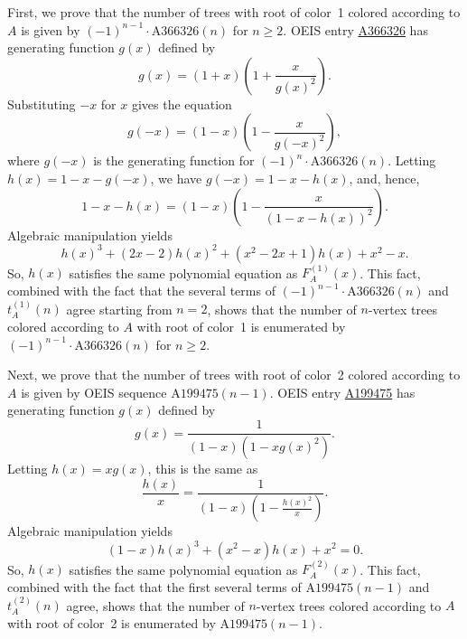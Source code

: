 \documentclass[12pt]{amsart}
\newcommand{\seqnum}[1]{\href{https://oeis.org/#1}{#1}}
\newcommand{\gff}[2]{F_{#2}^{(#1)}(x)}
\newcommand{\gfa}[1]{\gff{#1}{A}}
\begin{document}
\begin{description}
\begin{itemize}
\end{itemize}
    \item[Discussion] 
    First, we prove that the number of trees with root of color~1 colored according to $A$ is given by $(-1)^{n-1}\cdot \text{A366326}(n)$ for $n\geq2$. OEIS entry \seqnum{A366326} has generating function $g(x)$ defined by
    \[
    g(x)=\left(1+x\right)\left(1+\frac{x}{g(x)^2}\right).
    \]
    Substituting $-x$ for $x$ gives the equation
    \[
    g(-x)=\left(1-x\right)\left(1-\frac{x}{g(-x)^2}\right),
    \]
    where $g(-x)$ is the generating function for $(-1)^{n}\cdot \text{A366326}(n)$.
    Letting $h(x)=1-x-g(-x)$, we have $g(-x)=1-x-h(x)$, and, hence,
    \[
    1-x-h(x)=\left(1-x\right)\left(1-\frac{x}{\left(1-x-h(x)\right)^2}\right).
    \]
    Algebraic manipulation yields
    \[
    h(x)^3+(2x - 2)h(x)^2+(x^2 - 2x + 1)h(x)+x^2 - x.
    \]
    So, $h(x)$ satisfies the same polynomial equation as $\gfa{1}$. This fact, combined with the fact that the several terms of $(-1)^{n-1}\cdot \text{A366326}(n)$ and $t_A^{(1)}(n)$ agree starting from $n=2$, shows that the number of $n$-vertex trees colored according to $A$ with root of color~1 is enumerated by $(-1)^{n-1}\cdot \text{A366326}(n)$ for $n\geq2$.
    
    Next, we prove that the number of trees with root of color~2 colored according to $A$ is given by OEIS sequence $\text{A199475}(n-1)$.
    OEIS entry \seqnum{A199475} has generating function $g(x)$ defined by
    \[
    g(x) = \frac{1}{(1-x)(1 - xg(x)^2)}.
    \]
    Letting $h(x)=xg(x)$, this is the same as
    \[
    \frac{h(x)}{x}=\frac{1}{(1-x)\left(1 - \frac{h(x)^2}{x}\right)}.
    \]
    Algebraic manipulation yields
    \[
    (1-x)h(x)^3+(x^2-x)h(x)+x^2=0.
    \]
    So, $h(x)$ satisfies the same polynomial equation as $\gfa{2}$. This fact, combined with the fact that the first several terms of $\text{A199475}(n-1)$ and $t_A^{(2)}(n)$ agree, shows that the number of $n$-vertex trees colored according to $A$ with root of color~2 is enumerated by $\text{A199475}(n-1)$.
\end{description}
\end{document}
